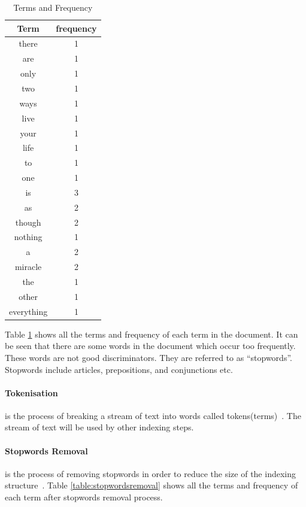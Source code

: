 \begin{table}
\centering
\begin{tabular}{|c|c|}

\hline \textbf{Term} & \textbf{frequency} \\
\hline there & 1 \\
\hline are & 1 \\
\hline only & 1 \\ 
\hline two & 1 \\
\hline ways & 1 \\
\hline live & 1 \\
\hline your & 1 \\
\hline life & 1 \\
\hline to & 1 \\
\hline one & 1 \\
\hline is & 3 \\
\hline as & 2 \\
\hline though & 2 \\
\hline nothing & 1 \\
\hline a & 2 \\
\hline miracle & 2 \\
\hline the & 1 \\
\hline other & 1 \\
\hline everything & 1 \\  
\hline
\end{tabular}
\caption{Terms and Frequency} \label{table:termsandfrequency}
\end{table}

Table \ref{table:termsandfrequency} shows all the terms and frequency of each term in the document. It can be seen that there are some words in the 
document which occur too frequently. These words are not good discriminators. They are referred to as ``stopwords''. Stopwords include
articles, prepositions, and conjunctions etc.

\paragraph{Tokenisation}
is the process of breaking a stream of text into words called tokens(terms)~\cite{tokenization}. The stream of text will be used by other indexing steps.

\paragraph{Stopwords Removal}
is the process of removing stopwords in order to reduce the size of the indexing structure~\cite[P. 15]{IRarchitecture}.
Table \ref{table:stopwordsremoval} shows all the terms and frequency of each term after stopwords removal process.

